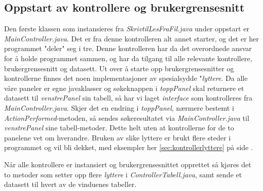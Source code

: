 \subsection{Oppstart av kontrollere og brukergrensesnitt}
Den første klassen som instansieres fra \emph{SkrivtilLesFraFil.java} under oppstart er \emph{MainController.java}.
Det er fra denne kontrolleren alt annet starter, og det er her programmet "deler" seg i tre. 
Denne kontrolleren har da det overordnede ansvar for å holde programmet sammen, og har da tilgang til alle relevante kontrollere, brukergrensesnitt og datasett. 
Ut over å starte opp brukergrensesnitter og kontrollerne finnes det noen implementasjoner av spesialsydde "\emph{lyttere}. 
Da alle våre paneler er egne javaklasser og søkeknappen i \emph{toppPanel} skal returnere et datasett til \emph{venstrePanel} sin tabell, så har vi laget \emph{interface} som kontrolleres fra \emph{MainController.java}. Skjer det en endring i \emph{toppPanel}, nærmere bestemt i \emph{ActionPerformed}-metoden, så sendes søkeresultatet via \emph{MainController.java} til \emph{venstrePanel} sine tabell-metoder. Dette helt uten at kontrollerne for de to panelene vet om hverandre.
Bruken av slike lyttere er brukt flere steder i programmet og vil bli dekket, med eksempler her \ref{sec:kontrollerlyttere} på side \pageref{sec:kontrollerlyttere}.

Når alle kontrollere er instansiert og brukergrensesnittet opprettet så kjøres det to metoder som setter opp flere \emph{lyttere} i \emph{ControllerTabell.java}, samt sende et datasett til hvert av de vinduenes tabeller.


